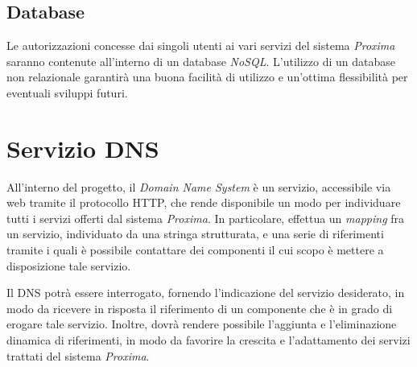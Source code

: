 \documentclass[a4paper,12pt]{report}
\begin{document}
\subsection{Database}

Le autorizzazioni concesse dai singoli utenti ai vari servizi del sistema \emph{Proxima} saranno contenute all'interno di un database \emph{NoSQL}. L'utilizzo di un database non relazionale garantirà una buona facilità di utilizzo e un'ottima flessibilità per eventuali sviluppi futuri.

\section{Servizio DNS} \label{design-dns}
All'interno del progetto, il \emph{Domain Name System} è un servizio, accessibile via web tramite il protocollo HTTP, che rende disponibile un modo per individuare tutti i servizi offerti dal sistema \emph{Proxima}. In particolare, effettua un \emph{mapping} fra un servizio, individuato da una stringa strutturata, e una serie di riferimenti tramite i quali è possibile contattare dei componenti il cui scopo è mettere a disposizione tale servizio. 

Il DNS potrà essere interrogato, fornendo l'indicazione del servizio desiderato, in modo da ricevere in risposta il riferimento di un componente che è in grado di erogare tale servizio. Inoltre, dovrà rendere possibile l'aggiunta e l'eliminazione dinamica di riferimenti, in modo da favorire la crescita e l'adattamento dei servizi trattati del sistema \emph{Proxima}.
\end{document}
